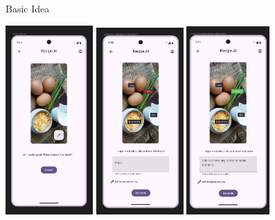 \documentclass{beamer}
\begin{document}
\begin{frame}{Basic Idea}
    \begin{center}
        \includegraphics[width=0.25\textwidth]{pic3.png} \hspace{6mm}
        \includegraphics[width=0.25\textwidth]{pic4.png} \hspace{6mm}
        \includegraphics[width=0.237\textwidth]{pic5.png} 
    \end{center}
\end{frame}
\end{document}
